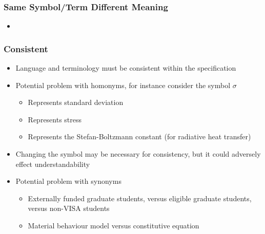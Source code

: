 \documentclass[t,12pt,numbers,fleqn]{beamer}
\begin{document}

\begin{frame}
\frametitle{Same Symbol/Term Different Meaning}

\begin{itemize}

\item {}

\end{itemize}

\end{frame}


\begin{frame}
\frametitle{Consistent}

\begin{itemize}

\item Language and terminology must be consistent within the specification
\item Potential problem with homonyms, for instance consider the symbol $\sigma$
\begin{itemize}
\item Represents standard deviation
\item Represents stress
\item Represents the Stefan-Boltzmann constant (for radiative heat transfer)
\end{itemize}
\item Changing the symbol may be necessary for consistency, but it could adversely effect understandability
\item Potential problem with synonyms
\begin{itemize}
\item Externally funded graduate students, versus eligible graduate students, versus non-VISA students
\item Material behaviour model versus constitutive equation
\end{itemize}
\end{itemize}

\end{frame}

\end{document}
